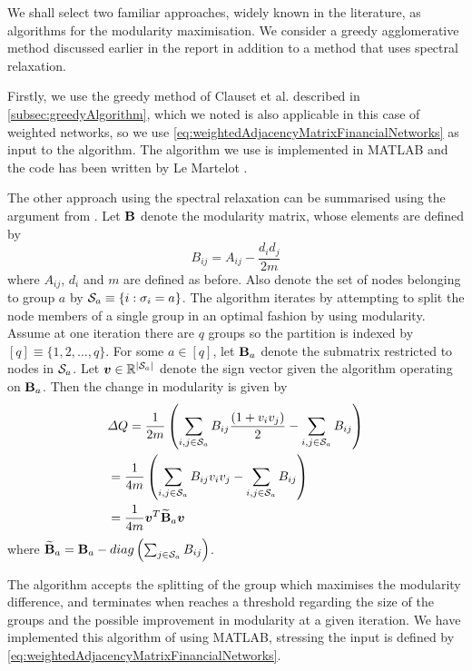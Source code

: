 We shall select two familiar approaches, widely known in the literature, as algorithms for the modularity maximisation.
We consider a greedy agglomerative method discussed earlier in the report in addition to a method that uses spectral relaxation.

Firstly, we use the greedy method of Clauset et al. \cite{CNM04} described in \cref{subsec:greedyAlgorithm}, which we noted is also applicable in this case of weighted networks, so we use \cref{eq:weightedAdjacencyMatrixFinancialNetworks} as input to the algorithm.
The algorithm we use is implemented in MATLAB and the code has been written by Le Martelot \cite{ELM}.

The other approach using the spectral relaxation can be summarised using the argument from \cite{DM}.
Let $\mathbf B$ denote the modularity matrix, whose elements are defined by
\begin{equation}
\label{eq:modularityMatrixFinancialNetworks}
	B_{ij} = A_{ij} - \frac{d_{i}d_{j}}{2m}
\end{equation}
where $A_{ij}$, $d_{i}$ and $m$ are defined as before.
Also denote the set of nodes belonging to group $a$ by $\mathcal S_{a} \equiv \{i:\sigma_{i} = a\}$.
The algorithm iterates by attempting to split the node members of a single group in an optimal fashion by using modularity.
Assume at one iteration there are $q$ groups so the partition is indexed by $[q] \equiv \{1,2,\dots,q\}$.
For some $a \in [q]$, let $\mathbf B_{a}$ denote the submatrix restricted to nodes in $\mathcal S_{a}$.
Let $\vecvar{v} \in \realsR^{\cardinality{\setvar{S}_{a}}}$ denote the sign vector given the algorithm operating on $\mathbf B_{a}$. Then the change in modularity is given by
\begin{equation}
\label{eq:changeModularityFinancialNetworks}
	\begin{split}
		&\Delta Q = \frac{1}{2m} \left( \sum_{i,j \in \setvar{S}_{a}} B_{ij}\frac{(1+v_{i}v_{j})}{2} - \sum_{i,j \in \setvar{S}_{a}} B_{ij} \right) \\
		&= \frac{1}{4m} \left( \sum_{i,j \in \setvar{S}_{a}} B_{ij}v_{i}v_{j} - \sum_{i,j \in \setvar{S}_{a}} B_{ij} \right)  \\
		&= \frac{1}{4m} \transpose{\vecvar{v}} \widetilde{\matvar{B}}_{a} \vecvar{v}
	\end{split}
\end{equation}
where $\widetilde{\mathbf B}_{a} = \mathbf B_{a} - diag \left( \sum_{j \in \mathcal S_{a}} B_{ij} \right)$.

The algorithm accepts the splitting of the group which maximises the modularity difference, and terminates when reaches a threshold regarding the size of the groups and the possible improvement in modularity at a given iteration.
We have implemented this algorithm of \cite{DM} using MATLAB, stressing the input is defined by \cref{eq:weightedAdjacencyMatrixFinancialNetworks}.

